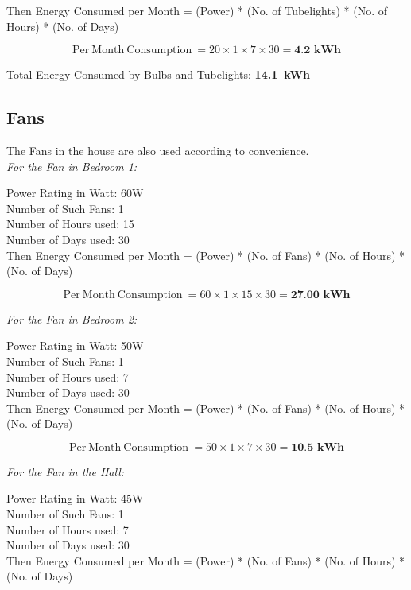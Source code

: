 \documentclass[11pt,a4paper]{article}
\begin{document}
Then Energy Consumed per Month = (Power) * (No. of Tubelights) * (No. of Hours) * (No. of Days)

$$
\mathrm{Per\ Month\ Consumption\ } = 20 \times 1 \times 7 \times 30 = \textbf{4.2\ kWh}
$$

\underline{Total Energy Consumed by Bulbs and Tubelights: \textbf{14.1\ kWh}}

\subsection{Fans}
The Fans in the house are also used according to convenience. \\

\noindent
\textit{For the Fan in Bedroom 1: \\}

\noindent
Power Rating in Watt: 60W\\
Number of Such Fans: 1\\
Number of Hours used: 15\\
Number of Days used: 30\\

Then Energy Consumed per Month = (Power) * (No. of Fans) * (No. of Hours) * (No. of Days)

$$
\mathrm{Per\ Month\ Consumption\ } = 60 \times 1 \times 15 \times 30 = \textbf{27.00\ kWh}
$$

\noindent
\textit{For the Fan in Bedroom 2:\\}

\noindent
Power Rating in Watt: 50W\\
Number of Such Fans: 1\\
Number of Hours used: 7\\
Number of Days used: 30\\

Then Energy Consumed per Month = (Power) * (No. of Fans) * (No. of Hours) * (No. of Days)

$$
\mathrm{Per\ Month\ Consumption\ } = 50 \times 1 \times 7 \times 30 = \textbf{10.5\ kWh}
$$


\noindent
\textit{For the Fan in the Hall: \\}

\noindent
Power Rating in Watt: 45W\\
Number of Such Fans: 1\\
Number of Hours used: 7\\
Number of Days used: 30\\

Then Energy Consumed per Month = (Power) * (No. of Fans) * (No. of Hours) * (No. of Days)
\end{document}
